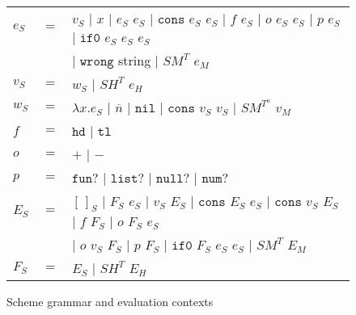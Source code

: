 \begin{figure}[p]
\centering
\begin{tabular}{lcl}
$e_{S}$ & $=$ & $v_{S}$ $\vert$ $x$ $\vert$ $e_{S}$ $e_{S}$ $\vert$ $\mathtt{cons}$ $e_{S}$ $e_{S}$ $\vert$ $f$ $e_{S}$ $\vert$ $o$ $e_{S}$ $e_{S}$ $\vert$ $p$ $e_{S}$ $\vert$ $\mathtt{if0}$ $e_{S}$ $e_{S}$ $e_{S}$ \\
&& $\vert$ $\mathtt{wrong}$ string $\vert$ $SM^{T}$ $e_{M}$ \\
$v_{S}$ & $=$ & $w_{S}$ $\vert$ $SH^{T}$ $e_{H}$ \\
$w_{S}$ & $=$ & $\lambda x.e_{S}$ $\vert$ $\overline{n}$ $\vert$ $\mathtt{nil}$ $\vert$ $\mathtt{cons}$ $v_{S}$ $v_{S}$ $\vert$ $SM^{T^{a}}$ $v_{M}$ \\
$f$ & $=$ & $\mathtt{hd}$ $\vert$ $\mathtt{tl}$ \\
$o$ & $=$ & $+$ $\vert$ $-$ \\
$p$ & $=$ & $\mathtt{fun?}$ $\vert$ $\mathtt{list?}$ $\vert$ $\mathtt{null?}$ $\vert$ $\mathtt{num?}$ \\
$E_{S}$ & $=$ & $[\,]_{S}$ $\vert$ $F_{S}$ $e_{S}$ $\vert$ $v_{S}$ $E_{S}$ $\vert$ $\mathtt{cons}$ $E_{S}$ $e_{S}$ $\vert$ $\mathtt{cons}$ $v_{S}$ $E_{S}$ $\vert$ $f$ $F_{S}$ $\vert$ $o$ $F_{S}$ $e_{S}$ \\
&& $\vert$ $o$ $v_{S}$ $F_{S}$ $\vert$ $p$ $F_{S}$ $\vert$ $\mathtt{if0}$ $F_{S}$ $e_{S}$ $e_{S}$ $\vert$ $SM^{T}$ $E_{M}$ \\
$F_{S}$ & $=$ & $E_{S}$ $\vert$ $SH^{T}$ $E_{H}$
\end{tabular}
\caption{Scheme grammar and evaluation contexts}
\label{sg}
\end{figure}